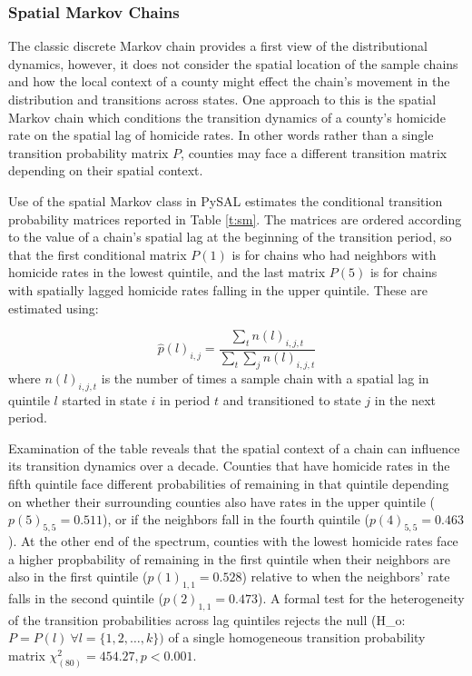 \documentclass[11pt, titlepage]{amsart}
\begin{document}
\subsubsection{Spatial Markov Chains}

The classic discrete Markov chain provides a first view of the
distributional dynamics, however, it does not consider the spatial
location of the sample chains and how the local context of a county
might effect the chain's movement in the distribution and transitions
across states. One approach to this is the spatial Markov chain
which conditions the transition dynamics of a county's homicide rate on
the spatial lag of homicide rates. In other words rather than a single
transition probability matrix $P$, counties may face a different
transition matrix depending on their spatial context.

Use of the spatial Markov class in PySAL estimates the conditional
transition probability matrices reported in Table \ref{t:sm}. The matrices are
ordered according to the value of a chain's spatial lag at the beginning
of the transition period, so that the first conditional matrix $P(1)$ is
for chains who had neighbors with homicide rates in the lowest quintile,
and the last matrix $P(5)$ is for chains with spatially lagged homicide
rates falling in the upper quintile. These are estimated using:

\begin{equation}
\hat{p}(l)_{i,j} = \frac{\sum_t n(l)_{i,j,t}}{\sum_t \sum_j n(l)_{i,j,t}} 
\label{e:cm}
\end{equation}
where $n(l)_{i,j,t}$ is the number of times a sample chain with a
spatial lag in quintile $l$ started in state $i$
in period $t$ and transitioned to state $j$ in the next period.

Examination of the table reveals that the spatial context of a chain can
influence its transition dynamics over a decade. Counties that have
homicide rates in the fifth quintile face different probabilities of
remaining in that quintile depending on whether their surrounding
counties also have rates in the upper quintile ($p(5)_{5,5} = 0.511$),
or if the neighbors fall in the fourth quintile ($p(4)_{5,5}=0.463$). At
the other end of the spectrum, counties with the lowest homicide rates
face a higher propbability of remaining in the first quintile when their
neighbors are also in the first quintile ($p(1)_{1,1}=0.528$) relative
to when the neighbors' rate falls in the second quintile
($p(2)_{1,1}=0.473$). A formal test for the heterogeneity of the
transition probabilities across lag quintiles rejects the null (H\_o:
$P=P(l) \ \forall l=\{1,2,\ldots,k\})$ of a single homogeneous transition
probability matrix $\chi_{(80)}^2=454.27, p<0.001$.
\end{document}
